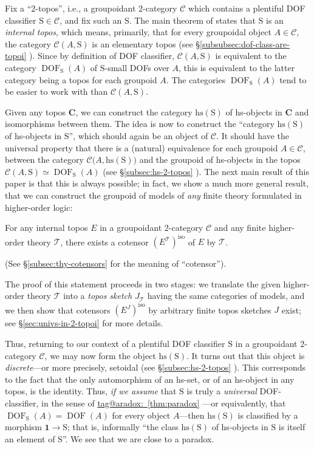 \documentclass{amsart}
\makeatletter
\newcommand\bC{\mathbf{C}}
\newcommand\cC{\mathcal{C}}
\newcommand\cT{\mathcal{T}}
\newcommand\DOF{\operatorname{DOF}}
\newcommand\hs{\mathrm{hs}}
\newcommand\iso{\mathrm{iso}}
\newcommand\pbig[1]{\big({#1}\big)}
\newcommand\rS{\mathrm{S}}
\newcommand\tm{\mathbf{1}}
\newcommand\tagword[1]{\csname tag@#1\endcsname}
\def\label@tag#1:#2\@nil{#1}
\newcommand\labeltag[1]{\label@tag#1:\@nil}
\newcommand\jref[1]{%
  \texorpdfstring%
    {\hyperref[#1]{\tagword{\labeltag{#1}}~\ref*{#1}}}%
    {\tagword{\labeltag{#1}}~\ref*{#1}}%
}
\newcommand\prerefpost[3]{%
  \texorpdfstring%
    {\hyperref[#2]{#1\ref*{#2}#3}}%
    {#1\ref*{#2}#3}%
}
\newcommand\sref[1]{\prerefpost{\S}{#1}{}}
\theoremstyle{definition}
\theoremstyle{remark}
\theoremstyle{plainwithref}
\makeatother
\begin{document}
Fix a ``2-topos'', i.e., a groupoidant 2-category \( \cC \) which contains a plentiful DOF classifier \( \rS \in \cC \), and fix such an \( \rS \).
The main theorem of \cite{helfer-topoi-in-topoi} states that \( \rS \) is an \emph{internal topos}, which means, primarily, that for every groupoidal object \( A \in \cC \), the category \( \cC(A, \rS) \) is an elementary topos (see \sref{subsubsec:dof-class-are-topoi}).
Since by definition of DOF classifier, \( \cC(A, \rS) \) is equivalent to the category \( \DOF_\rS(A) \) of \( \rS \)-small DOFs over \( A \), this is equivalent to the latter category being a topos for each groupoid \( A \).
The categories \( \DOF_\rS(A) \) tend to be easier to work with than \( \cC(A, \rS) \).

Given any topos \( \bC \), we can construct the category \( \hs(\rS) \) of hs-objects in \( \bC \) and isomorphisms between them.
The idea is now to construct the ``category \( \hs(\rS) \) of hs-objects in \( \rS \)'', which should again be an object of \( \cC \).
It should have the universal property that there is a (natural) equivalence for each groupoid \( A \in \cC \), between the category \( \cC\pbig{A,\hs(\rS)} \) and the groupoid of hs-objects in the topos \( \cC(A, \rS) \simeq \DOF_\rS(A) \) (see \sref{subsec:hs-2-topos}).
The next main result of this paper is that this is always possible; in fact, we show a much more general result, that we can construct the groupoid of models of \emph{any} finite theory formulated in higher-order logic:
{
  \renewcommand{\thedefn}{\ref{thm:theory-cotensors}}
  \begin{thm}
    For any internal topos \( E \) in a groupoidant 2-category \( \cC \) and any finite higher-order theory \( \cT \), there exists a cotensor \( (E^\cT)^\iso \) of \( E \) by \( \cT \).
  \end{thm}
}
\noindent
(See \sref{subsec:thy-cotensors} for the meaning of ``cotensor'').

The proof of this statement proceeds in two stages: we translate the given higher-order theory \( \cT \) into a \emph{topos sketch} \( J_\cT \) having the same categories of models, and we then show that cotensors \( (E^J)^\iso \) by arbitrary finite topos sketches \( J \) exist; see \sref{sec:univs-in-2-topoi} for more details.

Thus, returning to our context of a plentiful DOF classifier \( \rS \) in a groupoidant 2-category \( \cC \), we may now form the object \( \hs(\rS) \).
It turns out that this object is \emph{discrete}---or more precisely, setoidal (see \sref{subsec:hs-2-topos}).
This corresponds to the fact that the only automorphism of an hs-set, or of an hs-object in any topos, is the identity.
Thus, \emph{if we assume} that \( \rS \) is truly a \emph{universal} DOF-classifier, in the sense of \jref{thm:paradox}---or equivalently, that \( \DOF_\rS(A) = \DOF(A) \) for every object \( A \)---then \( \hs(\rS) \) is classified by a morphism \( \tm \to \rS \); that is, informally ``the class \( \hs(\rS) \) of hs-objects in \( \rS \) is itself an element of \( \rS \)''.
We see that we are close to a paradox.
\end{document}
